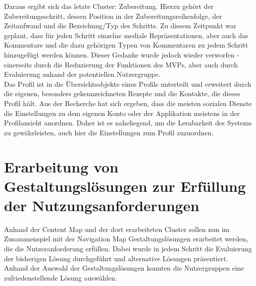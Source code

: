 Daraus ergibt sich das letzte Cluster: Zubereitung. Hierzu gehört der Zubereitungsschritt, dessen Position in der Zubereitungsreihenfolge, der Zeitaufwand und die Bezeichung/Typ des Schritts. Zu diesem Zeitpunkt war geplant, dass für jeden Schritt einzelne mediale Repräsentationen, aber auch das Kommentare und die dazu gehörigen Typen von Kommentaren zu jedem Schritt hinzugefügt werden können. Dieser Gedanke wurde jedoch wieder verworfen - einerseits durch die Reduzierung der Funktionen des MVPs, aber auch durch Evaluierung anhand der potentiellen Nutzergruppe.\\ 

Das Profil ist in die Übersichtsobjekte eines Profils unterteilt und erweitert durch die eigenen, besonders gekennzeichneten Rezepte und die Kontakte, die dieses Profil hält. Aus der Recherche hat sich ergeben, dass die meisten sozialen Dienste die Einstellungen zu dem eigenen Konto oder der Applikation meistens in der Profilansicht anordnen. Daher ist es naheliegend, um die Lernbarkeit des Systems zu gewährleisten, auch hier die Einstellungen zum Profil zuzuordnen. \\


\chapter{Erarbeitung von Gestaltungslösungen zur Erfüllung der Nutzungsanforderungen}
Anhand der Content Map und der dort erarbeiteten Cluster sollen nun im Zusammenspiel mit der Navigation Map Gestaltungslösungen erarbeitet werden, die die Nutzeranforderung erfüllen. Dabei wurde in jedem Schritt die Evaluierung der bisherigen Lösung durchgeführt und alternative Lösungen präsentiert. Anhand der Auswahl der Gestaltungslösungen konnten die Nutzergruppen eine zufriedenstellende Lösung auswählen.

